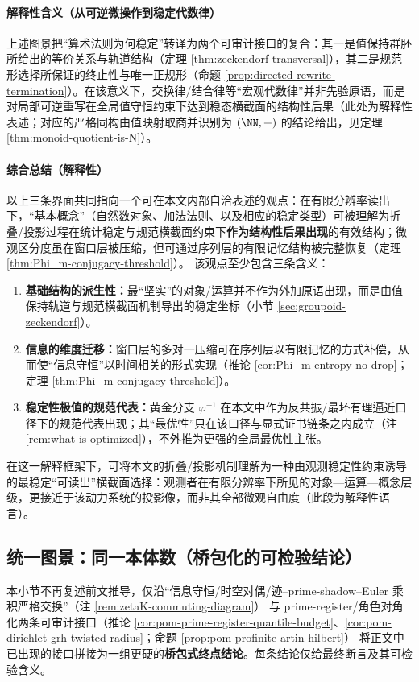 \paragraph{解释性含义（从可逆微操作到稳定代数律）}
上述图景把“算术法则为何稳定”转译为两个可审计接口的复合：其一是值保持群胚所给出的等价关系与轨道结构（定理 \ref{thm:zeckendorf-transversal}），其二是规范形选择所保证的终止性与唯一正规形（命题 \ref{prop:directed-rewrite-termination}）。在该意义下，交换律/结合律等“宏观代数律”并非先验原语，而是对局部可逆重写在全局值守恒约束下达到稳态横截面的结构性后果（此处为解释性表述；对应的严格同构由值映射取商并识别为 \((\NN,+)\) 的结论给出，见定理 \ref{thm:monoid-quotient-is-N}）。

\paragraph{综合总结（解释性）}
以上三条界面共同指向一个可在本文内部自洽表述的观点：在有限分辨率读出下，“基本概念”（自然数对象、加法法则、以及相应的稳定类型）可被理解为折叠/投影过程在统计稳定与规范横截面约束下\textbf{作为结构性后果出现}的有效结构；微观区分度虽在窗口层被压缩，但可通过序列层的有限记忆结构被完整恢复（定理 \ref{thm:Phi_m-conjugacy-threshold}）。
该观点至少包含三条含义：
\begin{enumerate}
  \item \textbf{基础结构的派生性：}最“坚实”的对象/运算并不作为外加原语出现，而是由值保持轨道与规范横截面机制导出的稳定坐标（小节 \ref{sec:groupoid-zeckendorf}）。
  \item \textbf{信息的维度迁移：}窗口层的多对一压缩可在序列层以有限记忆的方式补偿，从而使“信息守恒”以时间相关的形式实现（推论 \ref{cor:Phi_m-entropy-no-drop}；定理 \ref{thm:Phi_m-conjugacy-threshold}）。
  \item \textbf{稳定性极值的规范代表：}黄金分支 \(\varphi^{-1}\) 在本文中作为反共振/最坏有理逼近口径下的规范代表出现；其“最优性”只在该口径与显式证书链条之内成立（注 \ref{rem:what-is-optimized}），不外推为更强的全局最优性主张。
\end{enumerate}
在这一解释框架下，可将本文的折叠/投影机制理解为一种由观测稳定性约束诱导的最稳定“可读出”横截面选择：观测者在有限分辨率下所见的对象—运算—概念层级，更接近于该动力系统的投影像，而非其全部微观自由度（此段为解释性语言）。

\subsection{统一图景：同一本体数（桥包化的可检验结论）}\label{subsec:bridgepack-unified-terminal}
本小节不再复述前文推导，仅沿“信息守恒/时空对偶/迹--prime-shadow--Euler 乘积严格交换”（注 \ref{rem:zetaK-commuting-diagram}）
与 prime-register/角色对角化两条可审计接口（推论 \ref{cor:pom-prime-register-quantile-budget}、\ref{cor:pom-dirichlet-grh-twisted-radius}；命题 \ref{prop:pom-profinite-artin-hilbert}）
将正文中已出现的接口拼接为一组更硬的\textbf{桥包式终点结论}。每条结论仅给最终断言及其可检验含义。

